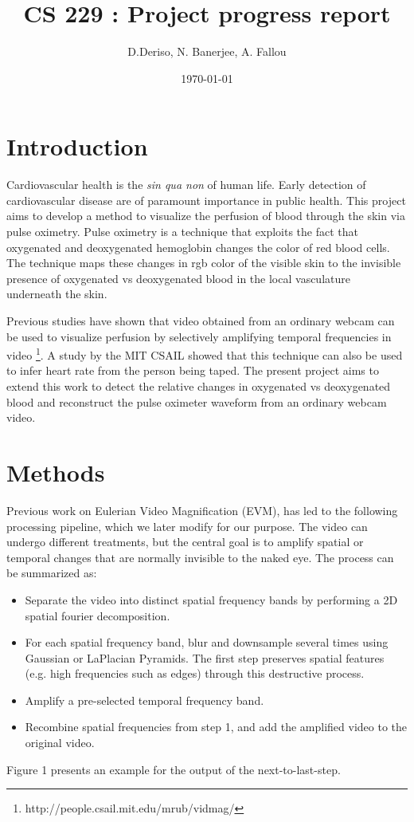 \documentclass[12pt]{article}
\begin{document}
  \title{CS 229 : Project progress report}
  \author{D.Deriso, N. Banerjee, A. Fallou}
  \date{\today}
  \maketitle
  \thispagestyle{empty}



\section*{Introduction}
%
\small  
Cardiovascular health is the \emph{sin qua non} of human life. Early detection of cardiovascular disease are of paramount importance in public health. This project aims to develop a method to visualize the perfusion of blood through the skin via pulse oximetry. Pulse oximetry is a technique that exploits the fact that oxygenated and deoxygenated hemoglobin changes the color of red blood cells. The technique maps these changes in rgb color of the visible skin to the invisible presence of oxygenated vs deoxygenated blood in the local vasculature underneath the skin.

Previous studies have shown that video obtained from an ordinary webcam can be used to visualize perfusion by selectively amplifying temporal frequencies in video \footnote{http://people.csail.mit.edu/mrub/vidmag/}. A study by the MIT CSAIL showed that this technique can also be used to infer heart rate from the person being taped. The present project aims to extend this work to detect the relative changes in oxygenated vs deoxygenated blood and reconstruct the pulse oximeter waveform from an ordinary webcam video.



\section{Methods}

Previous work on Eulerian Video Magnification (EVM), has led to the following processing pipeline, which we later modify for our purpose. The video can undergo different treatments, but the central goal is to amplify spatial or temporal changes that are normally invisible to the naked eye. The process can be summarized as:

  \begin{itemize}
    \item Separate the video into distinct spatial frequency bands by performing a 2D spatial fourier decomposition. 
    \item For each spatial frequency band, blur and downsample several times using Gaussian or LaPlacian Pyramids. The first step preserves spatial features (e.g. high frequencies such as edges) through this destructive process.
    \item Amplify a pre-selected temporal frequency band.
    \item Recombine spatial frequencies from step 1, and add the amplified video to the original video.
  \end{itemize}
  Figure 1 presents an example for the output of the next-to-last-step. 
\end{document}
